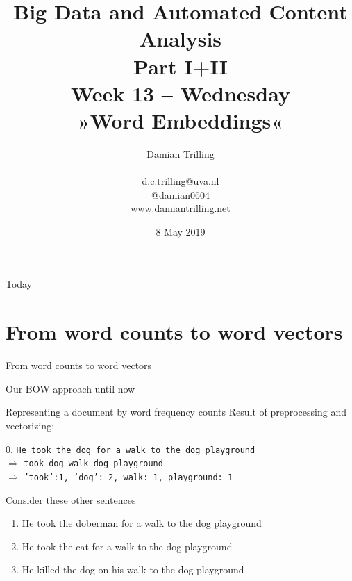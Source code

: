 \documentclass{beamer}
\begin{document}
\title[Big Data and Automated Content Analysis]{\textbf{Big Data and Automated Content Analysis\\ Part I+II} \\ Week 13 -- Wednesday \\ »Word Embeddings«}
\author[Damian Trilling]{Damian Trilling \\ ~ \\ \footnotesize{d.c.trilling@uva.nl \\@damian0604} \\ \url{www.damiantrilling.net}}
\date{8 May 2019}


\begin{frame}{}
\titlepage
\end{frame}

\begin{frame}{Today}
\tableofcontents
\end{frame}







\section{From word counts to word vectors}

\begin{frame}[plain]
From word counts to word vectors
\end{frame}


\begin{frame}{Our BOW approach until now}
\begin{block}{Representing a document by word frequency counts}
Result of preprocessing and vectorizing:

0. \texttt{He took the dog for a walk to the dog playground}\\
$\Rightarrow$ \texttt{took dog walk dog playground}\\
$\Rightarrow$ \texttt{'took':1, 'dog': 2, walk: 1, playground: 1}
\end{block}

Consider these other sentences
\begin{enumerate}
	\item<2-> He took the doberman for a walk to the dog playground
	\item<3-> He took the cat for a walk to the dog playground
	\item<4-> He killed the dog on his walk to the dog playground 
\end{enumerate}


\end{frame}
\end{document}

